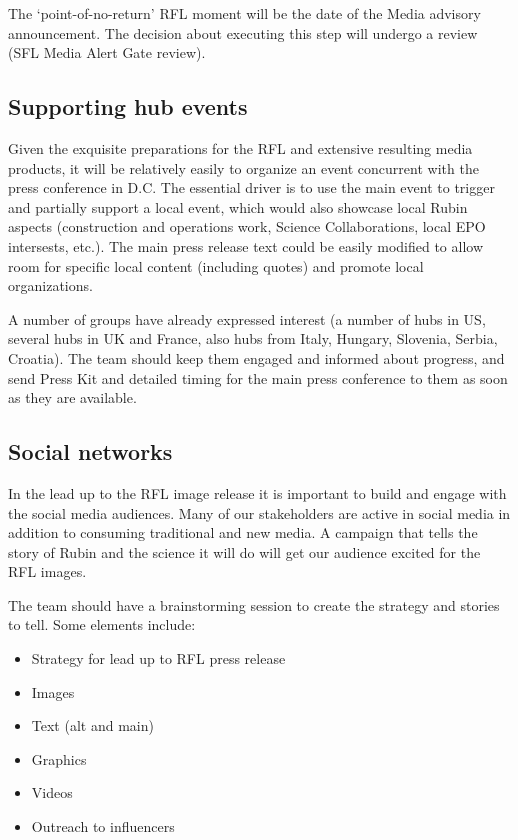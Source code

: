 The ‘point-of-no-return’ RFL moment will be the date of the Media advisory announcement.
The decision about executing this step will undergo a review (SFL Media Alert Gate review).
 


\subsection{Supporting hub events}

Given the exquisite preparations for the RFL and extensive resulting media products, it will be
relatively easily to organize an event concurrent with the press conference in D.C. The essential
driver is to use the main event to trigger and partially support a local event, which would also
showcase local Rubin aspects (construction and operations work, Science Collaborations, local
EPO intersests, etc.). The main press release text could be easily modified to allow room for
specific local content (including quotes) and promote local organizations. 

A number of groups have already expressed interest (a number of hubs in US, several hubs in
UK and France, also hubs from Italy, Hungary, Slovenia, Serbia, Croatia). The team should keep
them engaged and informed about progress, and send Press Kit and detailed timing for the
main press conference to them as soon as they are available. 



\subsection{Social networks}

In the lead up to the RFL image release it is important to build and engage with the social media audiences.
Many of our stakeholders are active in social media in addition to consuming traditional and new media.
A campaign that tells the story of Rubin and the science it will do will get our audience excited for the RFL images.

The team should have a brainstorming session to create the strategy and stories to tell. Some elements include:
\begin{itemize}
\item Strategy for lead up to RFL press release
\item Images
\item Text  (alt and main)
\item Graphics
\item Videos
\item Outreach to influencers
\end{itemize}



